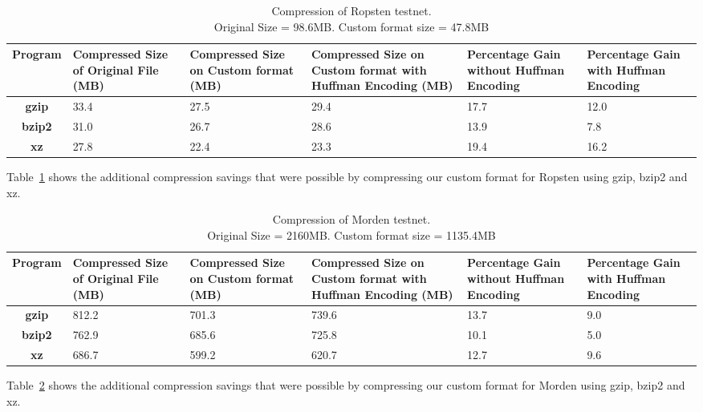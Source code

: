 \begin{table}[H]
\centering
\captionsetup{justification=centering}
\begin{tabular}{ >{\bfseries}c| p{2cm} | p{2cm} |p{2cm} | p{1.5cm} | p{1.5cm} }
	Program & {Compressed Size of Original File (MB)} & {Compressed Size on Custom format (MB)} & {Compressed Size on Custom format with Huffman Encoding (MB)}& Percentage Gain without Huffman Encoding & Percentage Gain with Huffman Encoding\\
  \hline
  gzip  & 33.4 & 27.5 & 29.4 & 17.7 & 12.0 \\
  bzip2 & 31.0 & 26.7 & 28.6 & 13.9 & 7.8  \\
  xz   & 27.8 & 22.4 &  23.3 & 19.4 & 16.2 \\
\end{tabular}
\caption{Compression of Ropsten testnet. \\ Original Size = 98.6MB. Custom format size = 47.8MB}
\label{tab:compropsten}
\end{table}
Table~\ref{tab:compropsten} 
shows the additional compression savings that were possible by compressing 
our custom format for Ropsten using gzip, bzip2 and xz.



\begin{table}[H]
\centering
\captionsetup{justification=centering}
\begin{tabular}{ >{\bfseries}c| p{2cm} | p{2cm} | p{2cm} | p{1.5cm} | p{1.5cm} }
	Program & {Compressed Size of Original File (MB)} & {Compressed Size on Custom format (MB)} & {Compressed Size on Custom format with Huffman Encoding (MB)} & Percentage Gain without Huffman Encoding & Percentage Gain with Huffman Encoding \\
  \hline
  gzip  & 812.2 & 701.3 & 739.6 & 13.7 & 9.0 \\
  bzip2 & 762.9 & 685.6 & 725.8 & 10.1 & 5.0 \\
  xz   & 686.7 & 599.2 &  620.7 & 12.7 & 9.6 \\
\end{tabular}
\caption{Compression of Morden testnet. \\Original Size = 2160MB. Custom format size = 1135.4MB}
\label{tab:compmorden}
\end{table}
Table~\ref{tab:compmorden} 
shows the additional compression savings that were possible by compressing 
our custom format for Morden using gzip, bzip2 and xz.

